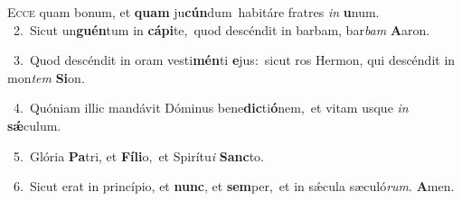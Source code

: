 \lettrine{\initial\textcolor{\initialcolor}{E}}{cce} quam bonum, et \textbf{quam} ju\-\textbf{cún}\-dum~\star habitáre fratres \textit{in} \textbf{u}\-num.\\
{\numbfont\textcolor{\numbcolor}{~2.}}~Sicut un\-\textbf{guén}\-tum in \textbf{cá}\-\textbf{pi}te,~\star quod descéndit in barbam, bar\textit{bam} \textbf{A}\-aron.\par
{\numbfont\textcolor{\numbcolor}{~3.}}~Quod descéndit in oram vesti\-\textbf{mén}\-ti \textbf{e}\-jus:~\star sicut ros Hermon, qui descéndit in mon\textit{tem} \textbf{Si}\-on.\par
{\numbfont\textcolor{\numbcolor}{~4.}}~Quóniam illic mandávit Dóminus bene\-\textbf{dic}\-ti\-\textbf{ó}\-nem,~\star et vitam usque \textit{in} \textbf{sǽ}\-culum.\par
{\numbfont\textcolor{\numbcolor}{~5.}}~Glória \textbf{Pa}\-tri, et \textbf{Fí}\-\textbf{li}o,~\star et Spirítu\textit{i} \textbf{Sanc}\-to.\par
{\numbfont\textcolor{\numbcolor}{~6.}}~Sicut erat in princípio, et \textbf{nunc}\-, et \textbf{sem}\-per,~\star et in sǽcula sæculó\-\textit{rum}\-. \textbf{A}\-men.\par
